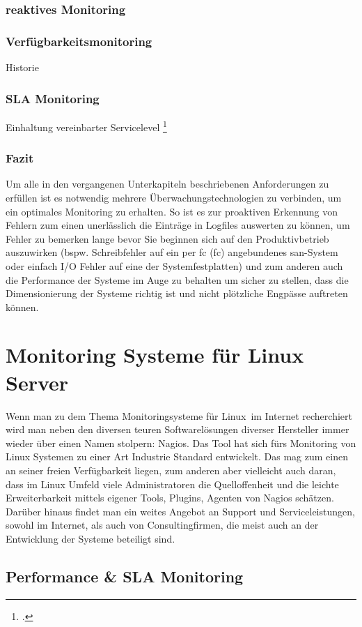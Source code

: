 \documentclass[12pt,a4paper,parskip]{scrreprt}
\begin{document}
	\subsection{reaktives Monitoring}
	\subsection{Verfügbarkeitsmonitoring}
	Historie
	\subsection{SLA Monitoring}
	Einhaltung vereinbarter Servicelevel \footcite[40]{iso20000sla}
	\subsection{Fazit}
	Um alle in den vergangenen Unterkapiteln beschriebenen Anforderungen zu erfüllen ist es notwendig mehrere Überwachungstechnologien zu verbinden, um ein optimales Monitoring zu erhalten. So ist es zur proaktiven Erkennung von Fehlern zum einen unerlässlich die Einträge in Logfiles auswerten zu können, um Fehler zu bemerken lange bevor Sie beginnen sich auf den Produktivbetrieb auszuwirken (bspw. Schreibfehler auf ein per \acrlong{fc} (\acrshort{fc}) angebundenes \gls{san}-System oder einfach I/O Fehler auf eine der Systemfestplatten) und zum anderen auch die Performance der Systeme im Auge zu behalten um sicher zu stellen, dass die Dimensionierung der Systeme richtig ist und nicht plötzliche Engpässe auftreten können.
	\chapter{Monitoring Systeme für Linux Server}
	Wenn man zu dem Thema \glqq Monitoringsysteme für Linux\grqq\ im Internet recherchiert wird man neben den diversen teuren Softwarelösungen diverser Hersteller immer wieder über einen Namen stolpern: Nagios. Das Tool hat sich fürs Monitoring von Linux Systemen zu einer Art Industrie Standard entwickelt. Das mag zum einen an seiner freien Verfügbarkeit liegen, zum anderen aber vielleicht auch daran, dass im Linux Umfeld viele Administratoren die Quelloffenheit und die leichte Erweiterbarkeit mittels eigener Tools, Plugins, Agenten von Nagios schätzen. Darüber hinaus findet man ein weites Angebot an Support und Serviceleistungen, sowohl im Internet, als auch von Consultingfirmen, die meist auch an der Entwicklung der Systeme beteiligt sind.
	
	
	\section{Performance \& SLA Monitoring}
\end{document}
